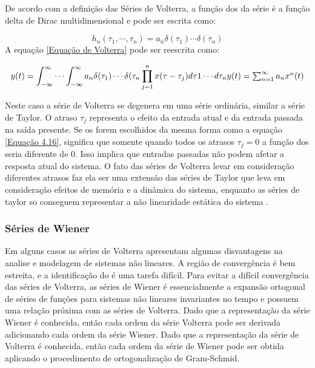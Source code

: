 De acordo com a definição das Séries de Volterra, a função dos  da série é a função delta de Dirac multidimensional e pode ser escrita como:

\begin{equation}
h_{n}(\tau_{1},\cdots,\tau_{n})=a_{n}\delta(\tau_{1})\cdots\delta(\tau_{n})
\label{Equação 4.16}
\end{equation}
A equação \ref{Equação de Volterra} pode ser reescrita como:

\begin{equation}
y(t) = \int_{-\infty}^{\infty} \cdots \int_{-\infty}^{\infty} a_{n}\delta(\tau_{1})\cdots\delta(\tau_{n}\prod_{j=1}^{n}x(\tau - \tau_{j})d\tau1 \cdots d\tau_{n}$$
$$ y(t) = \sum_{n=1}^{\infty} a_{n}x^{n}(t)
\end{equation}

Neste caso a série de Volterra se degenera em uma série ordinária, similar a série de Taylor. O atraso $\tau_{j}$ representa o efeito da entrada atual e da entrada passada na saída presente. Se os  forem escolhidos da mesma forma como a equação \ref{Equação 4.16}, significa que somente quando todos os atrasos $\tau_{j} = 0$ a função dos  seria diferente de 0. Isso implica que entradas passadas não podem afetar a resposta atual do sistema. O fato das séries de Volterra levar em consideração diferentes atrasos faz ela ser uma extensão das séries de Taylor que leva em consideração efeitos de memória e a dinâmica do sistema, enquanto as séries de taylor so conseguem representar a não linearidade estática do sistema \cite{cheng2017volterra}.

\subsubsection*{Séries de Wiener}
Em alguns casos as séries de Volterra apresentam algumas disvantagens na analise e modelagem de sistemas não lineares. A região de convergência é bem estreita, e a identificação do  é uma tarefa difícil. Para evitar a difícil convergência das séries de Volterra, as séries de Wiener é essencialmente a expansão ortogonal de séries de funções para sistemas não lineares invariantes no tempo e possuem uma relação próxima com as séries de Volterra. Dado que a representação da série Wiener é conhecida, então cada ordem da série Volterra pode ser derivada adicionando cada ordem da série Wiener.
Dado que a representação da série de Volterra é conhecida, então cada ordem da série de Wiener pode ser obtida aplicando o procedimento de ortogonalização de Gram-Schmid.

